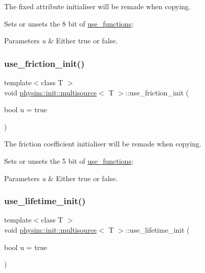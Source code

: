 The fixed attribute initialiser will be remade when copying. 

Sets or unsets the 8 bit of \hyperlink{classphysim_1_1init_1_1multisource_a12caae3f36b17cd343065aab62b62a8c}{use\+\_\+functions}; 
\begin{DoxyParams}{Parameters}
{\em u} & Either true or false. \\
\hline
\end{DoxyParams}
\mbox{\label{classphysim_1_1init_1_1multisource_aa4a00aa2fa625043ec0d20e2303758ed}} 
\subsubsection{\texorpdfstring{use\+\_\+friction\+\_\+init()}{use\_friction\_init()}}
{\footnotesize\ttfamily template$<$class T $>$ \\
void \hyperlink{classphysim_1_1init_1_1multisource}{physim\+::init\+::multisource}$<$ T $>$\+::use\+\_\+friction\+\_\+init (\begin{DoxyParamCaption}\item[{bool}]{u = {\ttfamily true} }\end{DoxyParamCaption})}



The friction coefficient initialiser will be remade when copying. 

Sets or unsets the 5 bit of \hyperlink{classphysim_1_1init_1_1multisource_a12caae3f36b17cd343065aab62b62a8c}{use\+\_\+functions}; 
\begin{DoxyParams}{Parameters}
{\em u} & Either true or false. \\
\hline
\end{DoxyParams}
\mbox{\label{classphysim_1_1init_1_1multisource_a45156cd3cd13cb4ebc4540fa56251cd5}} 
\subsubsection{\texorpdfstring{use\+\_\+lifetime\+\_\+init()}{use\_lifetime\_init()}}
{\footnotesize\ttfamily template$<$class T $>$ \\
void \hyperlink{classphysim_1_1init_1_1multisource}{physim\+::init\+::multisource}$<$ T $>$\+::use\+\_\+lifetime\+\_\+init (\begin{DoxyParamCaption}\item[{bool}]{u = {\ttfamily true} }\end{DoxyParamCaption})}



